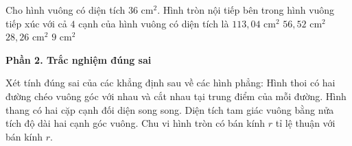 \begin{ex} %
Cho hình vuông có diện tích $36\text{ cm}^2$. Hình tròn nội tiếp bên trong hình vuông tiếp xúc với cả $4$ cạnh của hình vuông có diện tích là
\choice
{$113{,}04\text{ cm}^2$}
{$56{,}52\text{ cm}^2$}
{\True $28{,}26\text{ cm}^2$}
{$9\text{ cm}^2$}
\end{ex}

\textbf{Phần 2. Trắc nghiệm đúng sai}

\begin{ex} %
Xét tính đúng sai của các khẳng định sau về các hình phẳng:
\choiceTF
{\True Hình thoi có hai đường chéo vuông góc với nhau và cắt nhau tại trung điểm của mỗi đường.}
{Hình thang có hai cặp cạnh đối diện song song.}
{\True Diện tích tam giác vuông bằng nửa tích độ dài hai cạnh góc vuông.}
{\True Chu vi hình tròn có bán kính $r$ tỉ lệ thuận với bán kính $r$.}
\end{ex}

